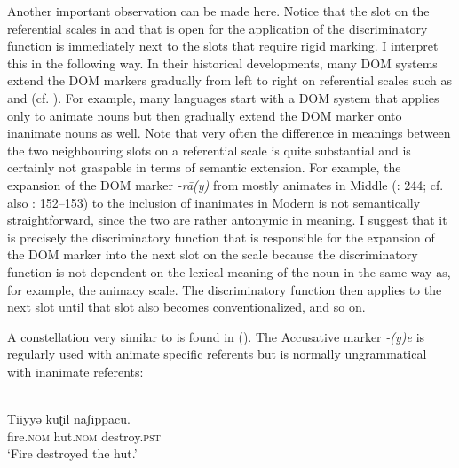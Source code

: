 \documentclass[output=paper]{langsci/langscibook}
\begin{document}
Another important observation can be made here. Notice that the slot on the referential scales in  and  that is open for the application of the discriminatory function is immediately next to the slots that require rigid marking. I interpret this in the following way. In their historical developments, many DOM systems extend the DOM markers gradually from left to right on referential scales such as  and  (cf. \citealt{DalrympleNikolaeva2011}). For example, many languages start with a DOM system that applies only to animate nouns but then gradually extend the DOM marker onto inanimate nouns as well. Note that very often the difference in meanings between the two neighbouring slots on a referential scale is quite substantial and is certainly not graspable in terms of semantic extension. For example, the expansion of the DOM marker \textit{{}-rā(y)} from mostly animates in Middle  (\citealt{Key2008}: 244; cf. also \citealt{Paul2008}: 152–153) to the inclusion of inanimates in Modern  is not semantically straightforward, since the two are rather antonymic in meaning. I suggest that it is precisely the discriminatory function that is responsible for the expansion of the DOM marker into the next slot on the scale because the discriminatory function is not dependent on the lexical meaning of the noun in the same way as, for example, the animacy scale. The discriminatory function then applies to the next slot until that slot also becomes conventionalized, and so on. 

A constellation very similar to  is found in  (). The Accusative marker \textit{{}-(y)e} is regularly used with animate specific  referents but is normally ungrammatical with inanimate referents: 

\ea\label{ex:serzant:10}
\\
\gll Tiiyyǝ       kuʈil   naʃippacu.\\
     fire.\textsc{nom}  hut.\textsc{nom}   destroy.\textsc{pst}\\
\glt ‘Fire destroyed the hut.’
\z
\end{document}
